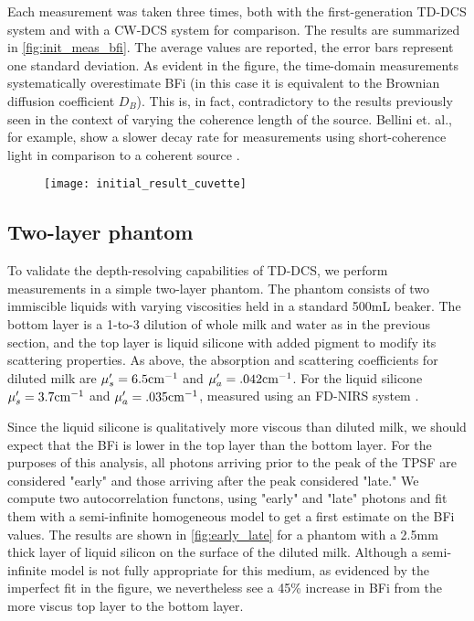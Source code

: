 Each measurement was taken three times, both with the first-generation TD-DCS system and with a CW-DCS system for comparison. The results are summarized in \autoref{fig:init_meas_bfi}. The average values are reported, the error bars represent one standard deviation. As evident in the figure, the time-domain measurements systematically overestimate BFi (in this case it is equivalent to the Brownian diffusion coefficient $D_B$). This is, in fact, contradictory to the results previously seen in the context of varying the coherence length of the source. Bellini et. al., for example, show a slower decay rate for measurements using short-coherence light in comparison to a coherent source \cite{Bellini1991}.

\begin{figure}[tb]
    \centering
    \texttt{[image: initial\_result\_cuvette]}
    \caption{}
    \label{fig:init_meas_bfi}
\end{figure}

\subsection{Two-layer phantom} \label{sec:two_layer}
To validate the depth-resolving capabilities of TD-DCS, we perform measurements in a simple two-layer phantom. The phantom consists of two immiscible liquids with varying viscosities held in a standard 500mL beaker. The bottom layer is a 1-to-3 dilution of whole milk and water as in the previous section, and the top layer is liquid silicone with added pigment to modify its scattering properties. As above, the absorption and scattering coefficients for diluted milk are $\mu_s'=6.5 \textnormal{cm}^{-1}$ and $\mu_a'=.042 \textnormal{cm}^{-1}$. For the liquid silicone $\mu_s'=3.7 \textnormal{cm}^{-1}$ and $\mu_a'=.035 \textnormal{cm}^{-1}$, measured using an FD-NIRS system \cite{MetaOx}.

Since the liquid silicone is qualitatively more viscous than diluted milk, we should expect that the BFi is lower in the top layer than the bottom layer. For the purposes of this analysis, all photons arriving prior to the peak of the TPSF are considered "early" and those arriving after the peak considered "late." We compute two autocorrelation functons, using "early" and "late" photons and fit them with a semi-infinite homogeneous model to get a first estimate on the BFi values. The results are shown in \autoref{fig:early_late} for a phantom with a 2.5mm thick layer of liquid silicon on the surface of the diluted milk. Although a semi-infinite model is not fully appropriate for this medium, as evidenced by the imperfect fit in the figure, we nevertheless see a 45\% increase in BFi from the more viscus top layer to the bottom layer.

